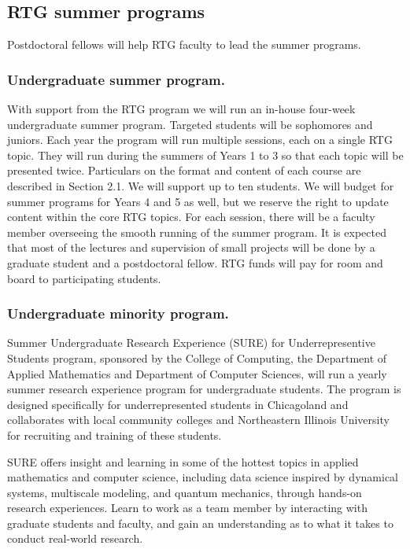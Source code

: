 \documentclass[11pt]{NSFamsart}
\begin{document}
\subsection{RTG summer programs}
 
Postdoctoral fellows will help RTG faculty to lead the   summer programs.

 \noindent
\subsubsection*{Undergraduate summer program.}
With support from the RTG program we will run an in-house four-week undergraduate summer program.
Targeted students will be sophomores and juniors. Each year the program will run multiple sessions, each on a single RTG topic. They will run during the summers of Years 1 to 3 so that each topic
will be presented twice. Particulars on the format and content of each course are described in Section 2.1.
We will support up to ten students. We will budget for summer programs for Years 4 and 5 as well, but we reserve
the right to update content within the core RTG topics. For each session, there will be a faculty member
  overseeing the smooth running of the summer program. It is expected that most of the lectures
and supervision of small projects will be done by a graduate student and a postdoctoral fellow. RTG funds
will pay for room and board to participating students.


\subsubsection*{Undergraduate minority program.} Summer Undergraduate Research Experience (SURE) for Underrepresentive Students program,   
sponsored by the College of Computing, the Department of Applied
Mathematics and Department of Computer Sciences, will run a yearly
summer research experience program for undergraduate students.
The program is designed specifically for underrepresented students in Chicagoland and 
  collaborates with local community colleges and Northeastern Illinois University for recruiting
and training of these students.

SURE offers insight and learning in some of the hottest topics in
applied mathematics and computer science, including data science inspired by dynamical systems, multiscale modeling, and quantum mechanics,   through hands-on research
experiences. Learn to work as a team member by interacting with graduate
students and faculty, and gain an understanding as to what it takes to
conduct real-world research.
\end{document}
